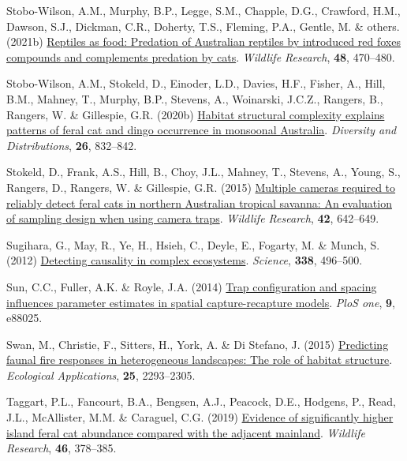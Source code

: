 \documentclass[11pt,a4paper,titlepage,twoside,openright]{style/unimelbthesis}
\newenvironment{CSLReferences}%
  {}%
  {\par}
\begin{document}
\begin{mainmatter}
\begin{CSLReferences}{1}{0}
\leavevmode{}%
Stobo-Wilson, A.M., Murphy, B.P., Legge, S.M., Chapple, D.G., Crawford, H.M., Dawson, S.J., Dickman, C.R., Doherty, T.S., Fleming, P.A., Gentle, M. \& others. (2021b) \href{https://doi.org/10.1071/WR20194}{Reptiles as food: Predation of {{A}ustralian} reptiles by introduced red foxes compounds and complements predation by cats}. \emph{Wildlife Research}, \textbf{48}, 470--480.

\leavevmode{}%
Stobo-Wilson, A.M., Stokeld, D., Einoder, L.D., Davies, H.F., Fisher, A., Hill, B.M., Mahney, T., Murphy, B.P., Stevens, A., Woinarski, J.C.Z., Rangers, B., Rangers, W. \& Gillespie, G.R. (2020b) \href{https://doi.org/10.1111/ddi.13065}{Habitat structural complexity explains patterns of feral cat and dingo occurrence in monsoonal {A}ustralia}. \emph{Diversity and Distributions}, \textbf{26}, 832--842.

\leavevmode{}%
Stokeld, D., Frank, A.S., Hill, B., Choy, J.L., Mahney, T., Stevens, A., Young, S., Rangers, D., Rangers, W. \& Gillespie, G.R. (2015) \href{https://doi.org/10.1071/WR15083}{Multiple cameras required to reliably detect feral cats in northern {A}ustralian tropical savanna: An evaluation of sampling design when using camera traps}. \emph{Wildlife Research}, \textbf{42}, 642--649.

\leavevmode{}%
Sugihara, G., May, R., Ye, H., Hsieh, C., Deyle, E., Fogarty, M. \& Munch, S. (2012) \href{https://doi.org/10.1126/science.1227079}{Detecting causality in complex ecosystems}. \emph{Science}, \textbf{338}, 496--500.

\leavevmode{}%
Sun, C.C., Fuller, A.K. \& Royle, J.A. (2014) \href{https://doi.org/10.1371/journal.pone.0088025}{Trap configuration and spacing influences parameter estimates in spatial capture-recapture models}. \emph{PloS one}, \textbf{9}, e88025.

\leavevmode{}%
Swan, M., Christie, F., Sitters, H., York, A. \& Di Stefano, J. (2015) \href{https://doi.org/10.1890/14-1533.1}{Predicting faunal fire responses in heterogeneous landscapes: The role of habitat structure}. \emph{Ecological Applications}, \textbf{25}, 2293--2305.

\leavevmode{}%
Taggart, P.L., Fancourt, B.A., Bengsen, A.J., Peacock, D.E., Hodgens, P., Read, J.L., McAllister, M.M. \& Caraguel, C.G. (2019) \href{https://doi.org/10.1071/WR18118}{Evidence of significantly higher island feral cat abundance compared with the adjacent mainland}. \emph{Wildlife Research}, \textbf{46}, 378--385.


\end{CSLReferences}
\end{mainmatter}
\end{document}
